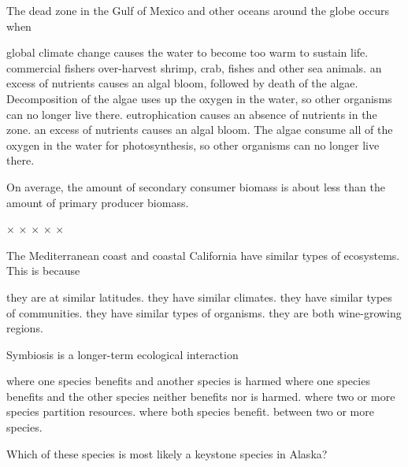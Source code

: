 
\question
The dead zone in the Gulf of Mexico and other oceans around the globe occurs when

\begin{choices}
\choice global climate change causes the water to become too warm to sustain life.
\choice commercial fishers over-harvest shrimp, crab, fishes and other sea animals.
\correctchoice an excess of nutrients causes an algal bloom, followed by death of the algae. Decomposition of the algae uses up the oxygen in the water, so other organisms can no longer live there.
\choice eutrophication causes an absence of nutrients in the zone.
\choice an excess of nutrients causes an algal bloom. The algae consume all of the oxygen in the water for photosynthesis, so other organisms can no longer live there.
\end{choices}

\question
On average, the amount of secondary consumer biomass is about \underline{\hspace{2cm}} less than the amount of primary producer biomass. 
\begin{choices}
$\times$ %
$\times$ %
$\times$ %
$\times$ %
$\times$%
\end{choices}

\question
The Mediterranean coast and coastal California have similar types of ecosystems. This is because

\begin{choices}
\choice they are at similar latitudes.
\correctchoice they have similar climates.
\choice they have similar types of communities.
\choice they have similar types of organisms.
\choice they are both wine-growing regions.
\end{choices}

\question
Symbiosis is a longer-term ecological interaction

\begin{choices}
\choice where one species benefits and another species is harmed 
\choice  where one species benefits and the other species neither benefits nor is harmed. 
\choice where two or more species partition resources. 
\choice where both species benefit. 
\correctchoice between two or more species. 
\end{choices}

\question
Which of these species is most likely a keystone species in Alaska?

